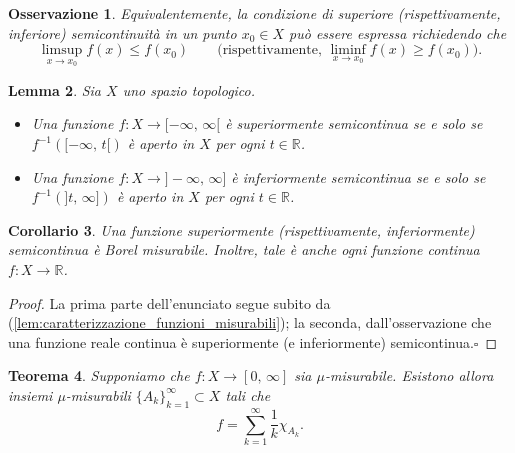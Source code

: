 \documentclass[a4paper,10pt,openright,oneside]{book}
\theoremstyle{theoremstyle}
\newtheorem{teorema}{Teorema}[section]
\newtheorem{lemma}[teorema]{Lemma}
\newtheorem{corollario}[teorema]{Corollario}
\theoremstyle{theoremstylewoheader}
\theoremstyle{theoremstyle}
\newtheorem{osservazione}[teorema]{Osservazione}
\theoremstyle{proofsecstyle}
\theoremstyle{nonumberplain}
\newtheorem{proof}{Dim.}
\newcommand{\RR}{\ensuremath{\mathbb{R}}}
\renewcommand{\qedsymbol}{\ensuremath{\square}}
\newcommand{\qed}{\unskip\nobreak\hfill\nobreak\hspace{.5em}\qedsymbol}
\begin{document}
\begin{osservazione}
Equivalentemente, la condizione di superiore (rispettivamente, inferiore) semicontinuità in un punto $x_0 \in X$ può essere espressa richiedendo che
\[
\limsup_{x \to x_0} f(x) \le f(x_0)\qquad\text{(rispettivamente, $\liminf_{x \to x_0} f(x) \ge f(x_0)$).}
\]
\end{osservazione}

\begin{lemma}
Sia $X$ uno spazio topologico.
\begin{itemize}
\item[(i)] Una funzione $f : X \rightarrow [-\infty,\, \infty[$ è superiormente semicontinua se e solo se $f^{-1}([-\infty,\, t[)$ è aperto in $X$ per ogni $t \in \RR$. 
\item[(ii)] Una funzione $f : X \rightarrow ]-\infty,\, \infty]$ è inferiormente semicontinua se e solo se $f^{-1}(]t,\, \infty])$ è aperto in $X$ per ogni $t \in \RR$.
\end{itemize}
\end{lemma}

\begin{corollario}
\label{cor:funzioni_semicontinue}
Una funzione superiormente (rispettivamente, inferiormente) semicontinua è Borel misurabile. Inoltre, tale è anche ogni funzione continua $f : X \rightarrow \RR$.
\end{corollario}

\begin{proof}
La prima parte dell'enunciato segue subito da (\ref{lem:caratterizzazione_funzioni_misurabili}); la seconda, dall'osservazione che una funzione reale continua è superiormente (e inferiormente) semicontinua.\qed
\end{proof}

\begin{teorema}
\label{thm:decomposizione_funzione_misurabile_non_negativa}
Supponiamo che $f : X \rightarrow [0,\, \infty]$ sia $\mu$-misurabile. Esistono allora insiemi $\mu$-misurabili $\{A_k\}_{k=1}^\infty \subset X$ tali che
\[
f = \sum_{k=1}^\infty \frac{1}{k} \chi_{A_k}.
\]
\end{teorema}
\end{document}
